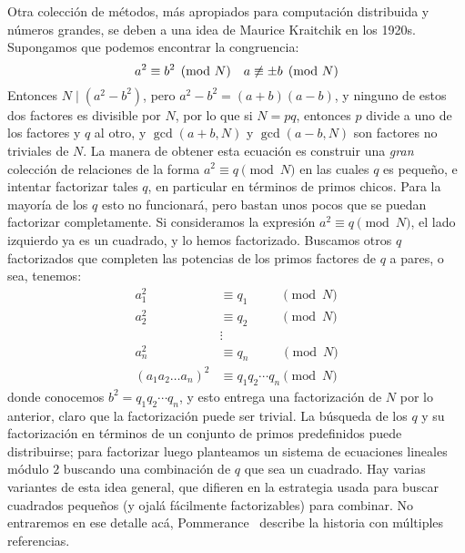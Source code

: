   Otra colección de métodos,
  más apropiados para computación distribuida y números grandes,
  se deben a una idea de Maurice Kraitchik en los 1920s.%
  Supongamos que podemos encontrar la congruencia:
  \begin{equation*}
    a^2 \equiv b^2 \pmod{N}
       \quad a \centernot\equiv \pm b \pmod{N}
  \end{equation*}
  Entonces \(N \mid (a^2 - b^2)\),
  pero \(a^2 - b^2 = (a + b) (a - b)\),
  y ninguno de estos dos factores es divisible por \(N\),
  por lo que si \(N = p q\),
  entonces \(p\) divide a uno de los factores y \(q\) al otro,
  y \(\gcd(a + b, N)\) y \(\gcd(a - b, N)\)
  son factores no triviales de \(N\).
  La manera de obtener esta ecuación
  es construir una \emph{gran} colección de relaciones de la forma
  \(a^2 \equiv q \pmod{N}\) en las cuales \(q\) es pequeño,
  e intentar factorizar tales \(q\),
  en particular en términos de primos chicos.
  Para la mayoría de los \(q\) esto no funcionará,
  pero bastan unos pocos que se puedan factorizar completamente.
  Si consideramos la expresión \(a^2 \equiv q \pmod{N}\),
  el lado izquierdo ya es un cuadrado,
  y lo hemos factorizado.
  Buscamos otros \(q\) factorizados
  que completen las potencias
  de los primos factores de \(q\) a pares,
  o sea,
  tenemos:
  \begin{align*}
    a_1^2
      &\equiv q_1 \phantom{q_2 \dotsm q_n} \pmod{N} \\
    a_2^2
      &\equiv q_2 \phantom{q_2 \dotsm q_n} \pmod{N} \\
      &\vdots \\
    a_n^2
      &\equiv q_n \phantom{q_2 \dotsm q_n} \pmod{N} \\
    (a_1 a_2 \dotso a_n)^2
      &\equiv q_1 q_2 \dotsm q_n \pmod{N}
  \end{align*}
  donde conocemos \(b^2 = q_1 q_2 \dotsm q_n\),
  y esto entrega una factorización de \(N\) por lo anterior,
  claro que la factorización puede ser trivial.
  La búsqueda de los \(q\)
  y su factorización
  en términos de un conjunto de primos predefinidos
  puede distribuirse;
  para factorizar luego planteamos
  un sistema de ecuaciones lineales módulo \(2\)
  buscando una combinación de \(q\) que sea un cuadrado.
  Hay varias variantes de esta idea general,
  que difieren en la estrategia usada
  para buscar cuadrados pequeños
  (y ojalá fácilmente factorizables)
  para combinar.
  No entraremos en ese detalle acá,
  Pommerance~\cite{pommerance96:_tale_two_sieves}%
  describe la historia con múltiples referencias.

